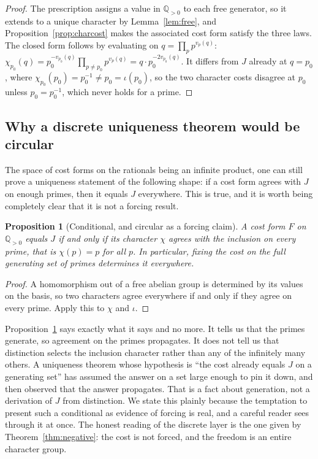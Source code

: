 \documentclass[11pt,a4paper]{article}
\newtheorem{proposition}[theorem]{Proposition}
\theoremstyle{definition}
\theoremstyle{remark}
\newcommand{\Qpos}{\mathbb{Q}_{>0}}
\begin{document}
\begin{proof}
The prescription assigns a value in $\Qpos$ to each free generator, so it extends
to a unique character by Lemma~\ref{lem:free}, and
Proposition~\ref{prop:charcost} makes the associated cost form satisfy the three
laws. The closed form follows by evaluating on $q = \prod_p p^{v_p(q)}$:
$\chi_{p_0}(q) = p_0^{-v_{p_0}(q)} \prod_{p \neq p_0} p^{v_p(q)}
= q \cdot p_0^{-2 v_{p_0}(q)}$. It differs from $J$ already at $q = p_0$, where
$\chi_{p_0}(p_0) = p_0^{-1} \neq p_0 = \iota(p_0)$, so the two character costs
disagree at $p_0$ unless $p_0 = p_0^{-1}$, which never holds for a prime.
\end{proof}

\subsection{Why a discrete uniqueness theorem would be circular}

The space of cost forms on the rationals being an infinite product, one can still
prove a uniqueness statement of the following shape: if a cost form agrees with
$J$ on enough primes, then it equals $J$ everywhere. This is true, and it is
worth being completely clear that it is not a forcing result.

\begin{proposition}[Conditional, and circular as a forcing claim]\label{prop:circular}
A cost form $F$ on $\Qpos$ equals $J$ if and only if its character $\chi$ agrees
with the inclusion on every prime, that is $\chi(p) = p$ for all $p$. In
particular, fixing the cost on the full generating set of primes determines it
everywhere.
\end{proposition}

\begin{proof}
A homomorphism out of a free abelian group is determined by its values on the
basis, so two characters agree everywhere if and only if they agree on every
prime. Apply this to $\chi$ and $\iota$.
\end{proof}

Proposition~\ref{prop:circular} says exactly what it says and no more. It tells
us that the primes generate, so agreement on the primes propagates. It does not
tell us that distinction selects the inclusion character rather than any of the
infinitely many others. A uniqueness theorem whose hypothesis is ``the cost
already equals $J$ on a generating set'' has assumed the answer on a set large
enough to pin it down, and then observed that the answer propagates. That is a
fact about generation, not a derivation of $J$ from distinction. We state this
plainly because the temptation to present such a conditional as evidence of
forcing is real, and a careful reader sees through it at once. The honest reading
of the discrete layer is the one given by Theorem~\ref{thm:negative}: the cost is
not forced, and the freedom is an entire character group.
\end{document}

